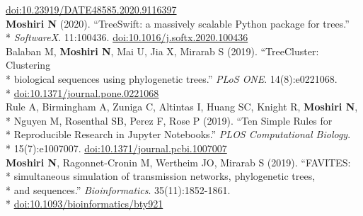 \documentclass[margin,line]{res}
\begin{document}
\begin{resume}
\hspace*{8mm} \href{https://doi.org/10.23919/DATE48585.2020.9116397}{doi:10.23919/DATE48585.2020.9116397}\\
\hspace*{4mm} \textbf{Moshiri N} (2020). ``TreeSwift: a massively scalable Python package for trees.''\\*\vspace{2mm}
\hspace*{8mm} \textit{SoftwareX}. 11:100436. \href{https://doi.org/10.1016/j.softx.2020.100436}{doi:10.1016/j.softx.2020.100436}\\
\hspace*{4mm} Balaban M, \textbf{Moshiri N}, Mai U, Jia X, Mirarab S (2019). ``TreeCluster: Clustering\\*
\hspace*{9mm} biological sequences using phylogenetic trees.'' \textit{PLoS ONE}. 14(8):e0221068.\\*\vspace{2mm}
\hspace*{8mm} \href{https://doi.org/10.1371/journal.pone.0221068}{doi:10.1371/journal.pone.0221068}\\
\hspace*{4mm} Rule A, Birmingham A, Zuniga C, Altintas I, Huang SC, Knight R, \textbf{Moshiri N},\\*
\hspace*{9mm} Nguyen M, Rosenthal SB, Perez F, Rose P (2019). ``Ten Simple Rules for\\*
\hspace*{9mm} Reproducible Research in Jupyter Notebooks.'' \textit{PLOS Computational Biology}.\\*\vspace{2mm}
\hspace*{8mm} 15(7):e1007007. \href{https://doi.org/10.1371/journal.pcbi.1007007}{doi:10.1371/journal.pcbi.1007007}\\
\hspace*{4mm} \textbf{Moshiri N}, Ragonnet-Cronin M, Wertheim JO, Mirarab S (2019). ``FAVITES:\\*
\hspace*{9mm} simultaneous simulation of transmission networks, phylogenetic trees,\\*
\hspace*{9mm} and sequences.'' \textit{Bioinformatics}. 35(11):1852-1861.\\*\vspace{2mm}
\hspace*{8mm} \href{https://doi.org/10.1093/bioinformatics/bty921}{doi:10.1093/bioinformatics/bty921}\\

\end{resume}
\end{document}
